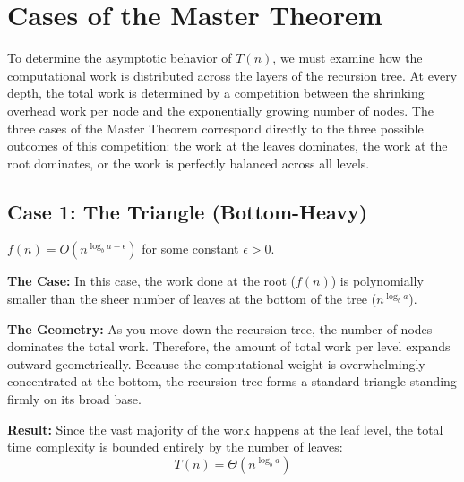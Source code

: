 \documentclass[11pt, a4paper]{article}
\begin{document}
\section*{Cases of the Master Theorem}
To determine the asymptotic behavior of $T(n)$, we must examine how the computational work is distributed across the layers of the recursion tree. At every depth, the total work is determined by a competition between the shrinking overhead work per node and the exponentially growing number of nodes. The three cases of the Master Theorem correspond directly to the three possible outcomes of this competition: the work at the leaves dominates, the work at the root dominates, or the work is perfectly balanced across all levels.
\vspace{0.5cm}
\subsection*{Case 1: The Triangle (Bottom-Heavy)}

\begin{tcolorbox}[colback=accent1!10, colframe=accent1, title=\textbf{Condition}]
$f(n) = O(n^{\log_b a - \epsilon})$ for some constant $\epsilon > 0$.
\end{tcolorbox}
\textbf{The Case:} In this case, the work done at the root ($f(n)$) is polynomially smaller than the sheer number of leaves at the bottom of the tree ($n^{\log_b a}$).

\textbf{The Geometry:} As you move down the recursion tree, the number of nodes dominates the total work. Therefore, the amount of total work per level expands outward geometrically. Because the computational weight is overwhelmingly concentrated at the bottom, the recursion tree forms a standard triangle standing firmly on its broad base. 

\textbf{Result:} Since the vast majority of the work happens at the leaf level, the total time complexity is bounded entirely by the number of leaves: 
\begin{equation*}
    T(n) = \Theta(n^{\log_b a})
\end{equation*}

\vspace{0.5cm}
\begin{center}
\end{center}
\vspace{1cm}
\newpage
\end{document}
